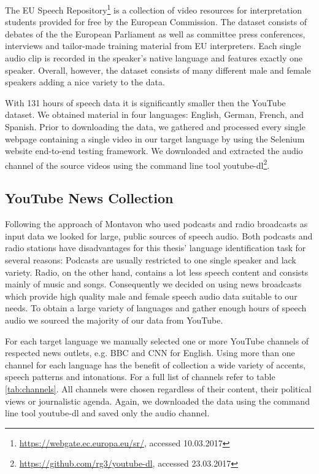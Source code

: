 	The EU Speech Repository\footnote{\url{https://webgate.ec.europa.eu/sr/}, accessed 10.03.2017} is a collection of video resources for interpretation students provided for free by the European Commission. The dataset consists of debates of the the European Parliament as well as committee press conferences, interviews and tailor-made training material from EU interpreters. Each single audio clip is recorded in the speaker's native language and features exactly one speaker. Overall, however, the dataset consists of many different male and female speakers adding a nice variety to the data.
	
		With 131 hours of speech data it is significantly smaller then the YouTube dataset. We obtained material in four languages: English, German, French, and Spanish. Prior to downloading the data, we gathered and processed every single webpage containing a single video in our target language by using the Selenium website end-to-end testing framework. We downloaded and extracted the audio channel of the source videos using the command line tool youtube-dl\footnote{\url{https://github.com/rg3/youtube-dl}, accessed 23.03.2017}.

\subsection{YouTube News Collection}
\label{sec:youtube_news}

	Following the approach of Montavon \cite{montavon2009deep} who used podcasts and radio broadcasts as input data we looked for large, public sources of speech audio. Both podcasts and radio stations have disadvantages for this thesis' language identification task for several reasons: Podcasts are usually restricted to one single speaker and lack variety. Radio, on the other hand, contains a lot less speech content and consists mainly of music and songs. Consequently we decided on using news broadcasts which provide high quality male and female speech audio data suitable to our needs. To obtain a large variety of languages and gather enough hours of speech audio we sourced the majority of our data from YouTube. 
	
	For each target language we manually selected one or more YouTube channels of respected news outlets, e.g. BBC and CNN for English. Using more than one channel for each language has the benefit of collection a wide variety of accents, speech patterns and intonations. For a full list of channels refer to table \ref{tab:channels}. All channels were chosen regardless of their content, their political views or journalistic agenda. Again, we downloaded the data using the command line tool youtube-dl and saved only the audio channel.
	
